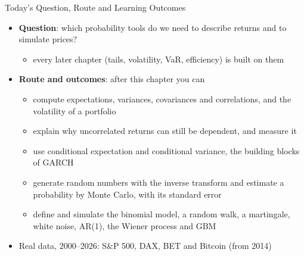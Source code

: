 \begin{frame}{Today's Question, Route and Learning Outcomes}
\itemsize{\small}
\begin{itemize}
    \item \textbf{Question}: which probability tools do we need to describe returns and to simulate prices?
    \begin{itemize}
        \item every later chapter (tails, volatility, VaR, efficiency) is built on them
    \end{itemize}
    \item \textbf{Route and outcomes}: after this chapter you can
    \begin{itemize}
        \item compute expectations, variances, covariances and correlations, and the volatility of a portfolio
        \item explain why uncorrelated returns can still be dependent, and measure it
        \item use conditional expectation and conditional variance, the building blocks of GARCH
        \item generate random numbers with the inverse transform and estimate a probability by Monte Carlo, with its standard error
        \item define and simulate the binomial model, a random walk, a martingale, white noise, AR(1), the Wiener process and GBM
    \end{itemize}
    \item Real data, 2000--2026: S\&P 500, DAX, BET and Bitcoin (from 2014)
\end{itemize}
\end{frame}

